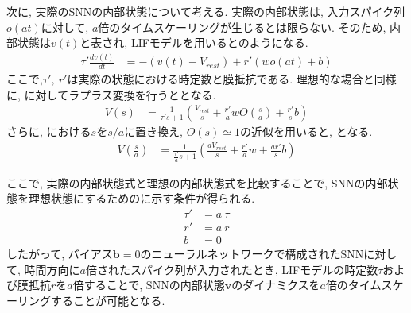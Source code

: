 次に, 実際のSNNの内部状態について考える.
実際の内部状態は, 入力スパイク列$o(at)$に対して, $a$倍のタイムスケーリングが生じるとは限らない.
そのため, 内部状態は$v(t)$と表され, LIFモデルを用いるとのようになる.
\begin{equation}
    \begin{split}
        \tau' \frac{dv(t)}{dt} &= -(v(t)-V_{rest}) + r'(w o(at) + b)
    \end{split}
    \label{sec2:eq:actual}
\end{equation}
ここで,$\tau',~r'$は実際の状態における時定数と膜抵抗である.
理想的な場合と同様に, に対してラプラス変換を行うととなる.
\begin{equation}
    \begin{split}
        V(s) &= \frac{1}{\tau' s+1}(\frac{V_{rest}}{s}+\frac{r'}{a} w O(\frac{s}{a})+\frac{r'}{s}b)
    \end{split}
    \label{sec2:eq:actual_laplace}
\end{equation}
さらに, における$s$を$s/a$に置き換え, $O(s)\simeq1$の近似を用いると, となる.
\begin{equation}
    \begin{split}
        V(\frac{s}{a}) &= \frac{1}{\frac{\tau'}{a} s+1}(\frac{aV_{rest}}{s}+\frac{r'}{a} w+\frac{a r'}{s}b)
    \end{split}
    \label{sec2:eq:actual_laplace2}
\end{equation}

ここで, 実際の内部状態式と理想の内部状態式を比較することで, SNNの内部状態を理想状態にするためのに示す条件が得られる.
\begin{equation}
    \begin{split}
        \tau'&=a ~\tau\\
        r'&=a~r \\
        b&=0
    \end{split}
    \label{sec2:eq:condition}
\end{equation}
したがって, バイアス$\bm{b}=0$のニューラルネットワークで構成されたSNNに対して, 時間方向に$a$倍されたスパイク列が入力されたとき, LIFモデルの時定数$\tau$および膜抵抗$r$を$a$倍することで, SNNの内部状態$\bm{v}$のダイナミクスを$a$倍のタイムスケーリングすることが可能となる.

